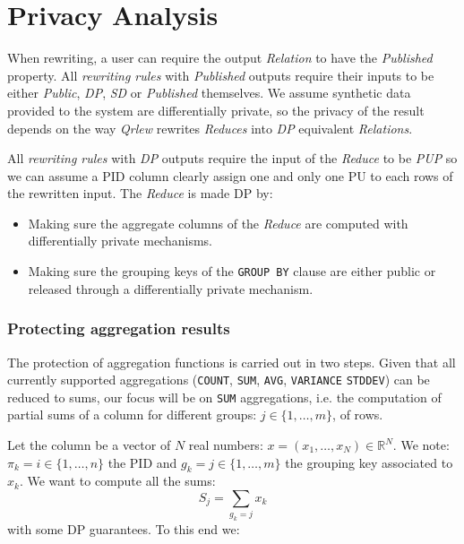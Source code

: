 \documentclass[letterpaper]{article} %
\newcommand{\qrlew}{\emph{Qrlew}}
\begin{document}
\section{Privacy Analysis}
\label{sec:privacy_analysis}

When rewriting, a user can require the output \emph{Relation} to have the \emph{Published} property. All \emph{rewriting rules} with \emph{Published} outputs require their inputs to be either \emph{Public}, \emph{DP}, \emph{SD} or \emph{Published} themselves. We assume synthetic data provided to the system are differentially private, so the privacy of the result depends on the way \qrlew{} rewrites \emph{Reduces} into \emph{DP} equivalent \emph{Relations}.

All \emph{rewriting rules} with \emph{DP} outputs require the input of the \emph{Reduce} to be \emph{PUP} so we can assume a PID column clearly assign one and only one PU to each rows of the rewritten input. The \emph{Reduce} is made DP by:
\begin{itemize}
    \item Making sure the aggregate columns of the \emph{Reduce} are computed with differentially private mechanisms.
    \item Making sure the grouping keys of the \texttt{GROUP BY} clause are either public or released through a differentially private mechanism.
\end{itemize}

\subsubsection{Protecting aggregation results}

The protection of aggregation functions is carried out in two steps. Given that all currently supported aggregations (\texttt{COUNT}, \texttt{SUM}, \texttt{AVG}, \texttt{VARIANCE} \texttt{STDDEV}) can be reduced to sums, our focus will be on \texttt{SUM} aggregations, i.e. the computation of partial sums of a column for different groups: $j\in\{1,\ldots,m\}$, of rows.

Let the column be a vector of $N$ real numbers: $x = \left(x_1,\ldots, x_N\right)\in\mathbb{R}^N$. We note: $\pi_k = i \in \{1,\ldots,n\}$ the PID and $g_k = j \in \{1,\ldots,m\}$ the grouping key associated to $x_k$.
We want to compute all the sums:
$$S_j = \sum_{g_k = j} x_k$$
with some DP guarantees. To this end we:
\end{document}
